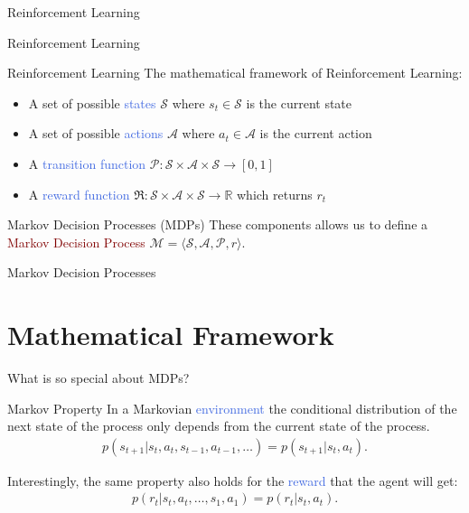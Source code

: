 \documentclass{beamer}
\begin{document}
\begin{frame}{Reinforcement Learning}
	
\end{frame}

\begin{frame}{Reinforcement Learning}
\end{frame}


\begin{frame}{Reinforcement Learning}
	The mathematical framework of Reinforcement Learning:
	\begin{itemize}
		\item A set of possible \textcolor{RoyalBlue}{states} $\mathcal{S}$ where $s_t\in\mathcal{S}$ is the current state
		\item A set of possible \textcolor{RoyalBlue}{actions} $\mathcal{A}$ where $a_t\in\mathcal{A}$ is the current action
		\item A \textcolor{RoyalBlue}{transition function} $\mathcal{P}:\mathcal{S}\times\mathcal{A}\times\mathcal{S}\rightarrow[0,1]$
		\item A \textcolor{RoyalBlue}{reward function} $\Re:\mathcal{S}\times\mathcal{A}\times\mathcal{S}\rightarrow \mathbb{R}$ which returns $r_t$
	\end{itemize}

	\begin{block}{Markov Decision Processes (MDPs)}
		These components allows us to define a \textcolor{Maroon}{Markov Decision Process} 
		\centering $\mathcal{M}=\langle \mathcal{S},\mathcal{A},\mathcal{P},r\rangle$.
	\end{block}

\end{frame}



\begin{frame}{Markov Decision Processes}
	\section{Mathematical Framework}
	What is so special about MDPs?
	\begin{block}{Markov Property}
		In a Markovian \textcolor{RoyalBlue}{environment} the conditional distribution of the next state of the process only depends from the current state of the process. 		\centering  	
		\begin{align*}
		p(s_{t+1}|s_t, a_t, s_{t-1}, a_{t-1}, \ldots) = p(s_{t+1} | s_t, a_t).
		\end{align*}
	\end{block}

	Interestingly, the same property also holds for the \textcolor{RoyalBlue}{reward} that the agent will get: 
	\begin{align*}
			p(r_t| s_t, a_t, \ldots, s_1, a_1) = p(r_t|s_t,a_t).
	\end{align*}
\end{frame}
\end{document}
